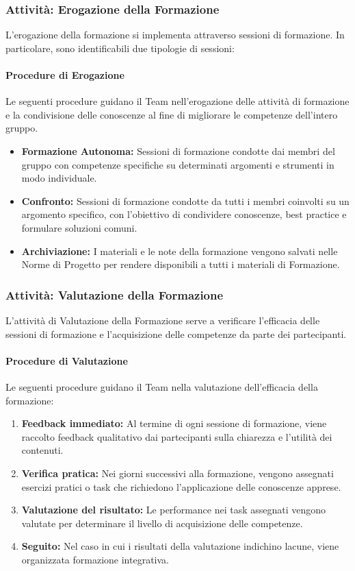 \documentclass[a4paper,12pt]{article}
\begin{document}
\subsubsection{Attività: Erogazione della Formazione}
L'erogazione della formazione si implementa attraverso sessioni di formazione. In particolare, sono identificabili due tipologie di sessioni:

\paragraph{Procedure di Erogazione}
Le seguenti procedure guidano il Team nell'erogazione delle attività di
formazione e la condivisione delle conoscenze al fine di migliorare le competenze dell'intero gruppo.
\begin{itemize}
    \item \textbf{Formazione Autonoma:} Sessioni di formazione condotte dai membri del gruppo con competenze specifiche su determinati argomenti e strumenti in modo individuale.
    \item \textbf{Confronto:} Sessioni di formazione condotte da tutti i membri coinvolti su un argomento specifico, con l'obiettivo di condividere conoscenze, best practice e formulare soluzioni comuni.
    \item \textbf{Archiviazione:} I materiali e le note della formazione vengono salvati nelle Norme di Progetto per rendere disponibili a tutti i materiali di Formazione.
\end{itemize}

\subsubsection{Attività: Valutazione della Formazione}
L'attività di Valutazione della Formazione serve a verificare l'efficacia delle sessioni di formazione e l'acquisizione delle competenze da parte dei partecipanti.
\paragraph{Procedure di Valutazione}
Le seguenti procedure guidano il Team nella valutazione dell'efficacia della formazione:
\begin{enumerate}
    \item \textbf{Feedback immediato:} Al termine di ogni sessione di formazione, viene raccolto feedback qualitativo dai partecipanti sulla chiarezza e l'utilità dei contenuti.
    \item \textbf{Verifica pratica:} Nei giorni successivi alla formazione, vengono assegnati esercizi pratici o task che richiedono l'applicazione delle conoscenze apprese.
    \item \textbf{Valutazione del risultato:} Le performance nei task assegnati vengono valutate per determinare il livello di acquisizione delle competenze.
    \item \textbf{Seguito:} Nel caso in cui i risultati della valutazione indichino lacune, viene organizzata formazione integrativa.
\end{enumerate}
\end{document}
